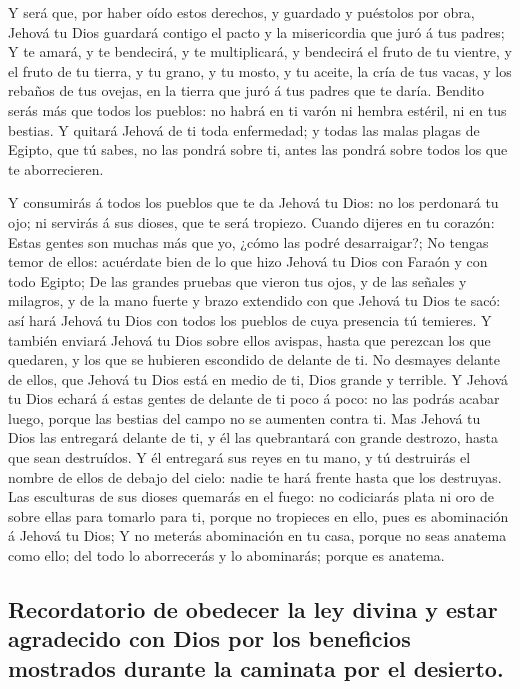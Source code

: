  Y será que, por haber oído estos derechos, y guardado y
puéstolos por obra, Jehová tu Dios guardará contigo el pacto y la
misericordia que juró á tus padres;  Y te amará, y te
bendecirá, y te multiplicará, y bendecirá el fruto de tu vientre, y el
fruto de tu tierra, y tu grano, y tu mosto, y tu aceite, la cría de tus
vacas, y los rebaños de tus ovejas, en la tierra que juró á tus padres
que te daría.  Bendito serás más que todos los pueblos: no
habrá en ti varón ni hembra estéril, ni en tus bestias.  Y
quitará Jehová de ti toda enfermedad; y todas las malas plagas de
Egipto, que tú sabes, no las pondrá sobre ti, antes las pondrá sobre
todos los que te aborrecieren.

 Y consumirás á todos los pueblos que te da Jehová tu Dios:
no los perdonará tu ojo; ni servirás á sus dioses, que te será tropiezo.
 Cuando dijeres en tu corazón: Estas gentes son muchas más
que yo, ¿cómo las podré desarraigar?;  No tengas temor de
ellos: acuérdate bien de lo que hizo Jehová tu Dios con Faraón y con
todo Egipto;  De las grandes pruebas que vieron tus ojos, y
de las señales y milagros, y de la mano fuerte y brazo extendido con que
Jehová tu Dios te sacó: así hará Jehová tu Dios con todos los pueblos de
cuya presencia tú temieres.  Y también enviará Jehová tu
Dios sobre ellos avispas, hasta que perezcan los que quedaren, y los que
se hubieren escondido de delante de ti.  No desmayes
delante de ellos, que Jehová tu Dios está en medio de ti, Dios grande y
terrible.  Y Jehová tu Dios echará á estas gentes de
delante de ti poco á poco: no las podrás acabar luego, porque las
bestias del campo no se aumenten contra ti.  Mas Jehová tu
Dios las entregará delante de ti, y él las quebrantará con grande
destrozo, hasta que sean destruídos.  Y él entregará sus
reyes en tu mano, y tú destruirás el nombre de ellos de debajo del
cielo: nadie te hará frente hasta que los destruyas.  Las
esculturas de sus dioses quemarás en el fuego: no codiciarás plata ni
oro de sobre ellas para tomarlo para ti, porque no tropieces en ello,
pues es abominación á Jehová tu Dios;  Y no meterás
abominación en tu casa, porque no seas anatema como ello; del todo lo
aborrecerás y lo abominarás; porque es anatema.

\hypertarget{recordatorio-de-obedecer-la-ley-divina-y-estar-agradecido-con-dios-por-los-beneficios-mostrados-durante-la-caminata-por-el-desierto.}{%
\subsection{Recordatorio de obedecer la ley divina y estar agradecido
con Dios por los beneficios mostrados durante la caminata por el
desierto.}\label{recordatorio-de-obedecer-la-ley-divina-y-estar-agradecido-con-dios-por-los-beneficios-mostrados-durante-la-caminata-por-el-desierto.}}

